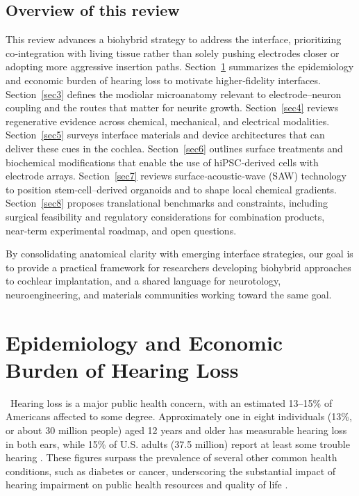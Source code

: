 \documentclass[referee,pdflatex, sn-vancouver-num]{sn-jnl}%
\theoremstyle{thmstyleone}%
\theoremstyle{thmstyletwo}%
\theoremstyle{thmstylethree}%
\begin{document}
\subsection{Overview of this review}
This review advances a biohybrid strategy to address the interface, prioritizing co‑integration with living tissue rather than solely pushing electrodes closer or adopting more aggressive insertion paths. Section~\ref{sec2} summarizes the epidemiology and economic burden of hearing loss to motivate higher‑fidelity interfaces. Section~\ref{sec3} defines the modiolar microanatomy relevant to electrode–neuron coupling and the routes that matter for neurite growth. Section~\ref{sec4} reviews regenerative evidence across chemical, mechanical, and electrical modalities. Section~\ref{sec5} surveys interface materials and device architectures that can deliver these cues in the cochlea. Section~\ref{sec6} outlines surface treatments and biochemical modifications that enable the use of hiPSC‑derived cells with electrode arrays. Section~\ref{sec7} reviews surface‑acoustic‑wave (SAW) technology to position stem‑cell–derived organoids and to shape local chemical gradients. Section~\ref{sec8} proposes translational benchmarks and constraints, including surgical feasibility and regulatory considerations for combination products, near‑term experimental roadmap, and open questions.

By consolidating anatomical clarity with emerging interface strategies, our goal is to provide a practical framework for researchers developing biohybrid approaches to cochlear implantation, and a shared language for neurotology, neuroengineering, and materials communities working toward the same goal.

\section{Epidemiology and Economic Burden of Hearing Loss}\label{sec2}
\ 
Hearing loss is a major public health concern, with an estimated 13--15\% of Americans affected to some degree. Approximately one in eight individuals (13\%, or about 30 million people) aged 12 years and older has measurable hearing loss in both ears, while 15\% of U.S. adults (37.5 million) report at least some trouble hearing \cite{cdc2010, cdc2021, wilson2014, Rein2024_LancetRegAm, NIDCD_QuickStats_2024}. These figures surpass the prevalence of several other common health conditions, such as diabetes or cancer, underscoring the substantial impact of hearing impairment on public health resources and quality of life \cite{WHO2025}.
\end{document}
